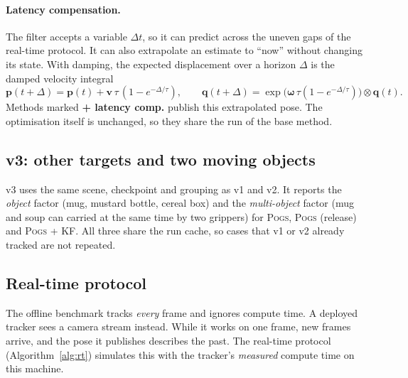 \documentclass[10pt,a4paper]{article}
\newcommand{\pogs}{\textsc{Pogs}}
\begin{document}
\paragraph{Latency compensation.} The filter accepts a variable $\Delta t$, so it
can predict across the uneven gaps of the real-time protocol. It can also
extrapolate an estimate to ``now'' without changing its state. With damping,
the expected displacement over a horizon $\Delta$ is the damped velocity integral
\begin{equation}
\mathbf{p}(t+\Delta) = \mathbf{p}(t) + \mathbf{v}\,\tau\,(1-e^{-\Delta/\tau}),\qquad
\mathbf{q}(t+\Delta) = \exp\!\big(\bm{\omega}\,\tau(1-e^{-\Delta/\tau})\big)\otimes\mathbf{q}(t).
\label{eq:extrap}
\end{equation}
Methods marked \textbf{+ latency comp.} publish this extrapolated pose. The
optimisation itself is unchanged, so they share the run of the base method.

\subsection{v3: other targets and two moving objects}
\label{sec:v3}

v3 uses the same scene, checkpoint and grouping as v1 and v2. It reports the
\emph{object} factor (mug, mustard bottle, cereal box) and the
\emph{multi-object} factor (mug and soup can carried at the same time by two
grippers) for \pogs{}, \pogs{} (release) and \pogs{} + KF. All three share
the run cache, so cases that v1 or v2 already tracked are not repeated.

\subsection{Real-time protocol}
\label{sec:realtime}

The offline benchmark tracks \emph{every} frame and ignores compute time. A
deployed tracker sees a camera stream instead. While it works on one frame, new
frames arrive, and the pose it publishes describes the past. The real-time
protocol (Algorithm~\ref{alg:rt}) simulates this with the tracker's
\emph{measured} compute time on this machine.
\end{document}
